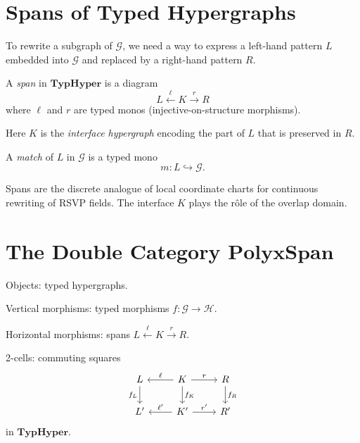 \section{Spans of Typed Hypergraphs}

To rewrite a subgraph of $\mathcal{G}$, we need a way to express
a left-hand pattern $L$ embedded into $\mathcal{G}$ and replaced by
a right-hand pattern $R$.

\begin{definition}[Span]
A \emph{span} in $\mathbf{TypHyper}$ is a diagram
\[
L \xleftarrow{\ell} K \xrightarrow{r} R
\]
where $\ell$ and $r$ are typed monos (injective-on-structure morphisms).
\end{definition}

Here $K$ is the \emph{interface hypergraph} encoding the part of $L$
that is preserved in $R$.

\begin{definition}[Match]
A \emph{match} of $L$ in $\mathcal{G}$ is a typed mono
\[
m : L \hookrightarrow \mathcal{G}.
\]
\end{definition}

Spans are the discrete analogue of local coordinate charts for continuous
rewriting of RSVP fields.  The interface $K$ plays the rôle of the
overlap domain.

\section{The Double Category \texorpdfstring{$\mathbf{PolyxSpan}$}{PolyxSpan}}

\begin{definition}
Objects: typed hypergraphs.

Vertical morphisms: typed morphisms $f : \mathcal{G}\to\mathcal{H}$.

Horizontal morphisms: spans $L \xleftarrow{\ell} K \xrightarrow{r} R$.

2-cells: commuting squares
\[
\begin{tikzcd}
L \arrow[d,"f_L"'] & K \arrow[l,"\ell"'] \arrow[r,"r"] \arrow[d,"f_K"] & R \arrow[d,"f_R"]\\
L' & K' \arrow[l,"\ell'"'] \arrow[r,"r'"] & R'
\end{tikzcd}
\]
in $\mathbf{TypHyper}$.
\end{definition}

